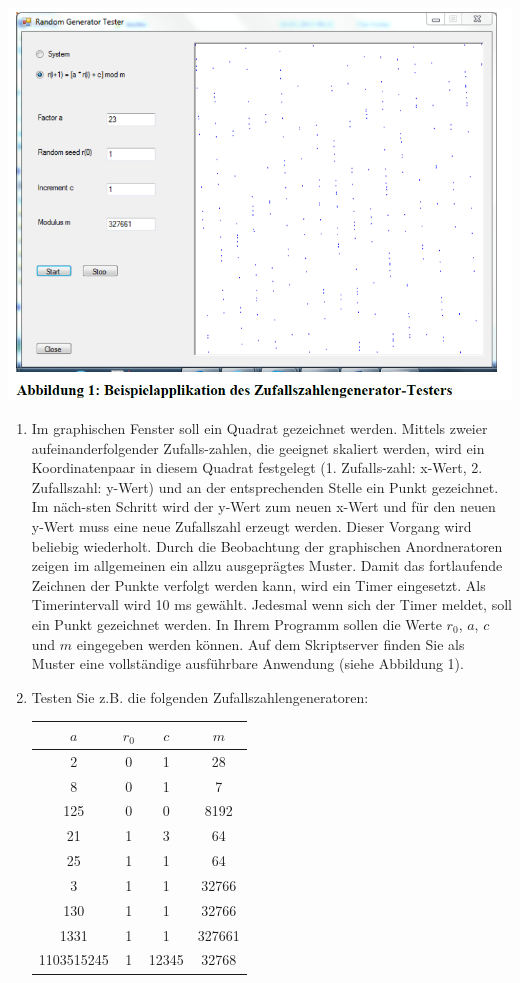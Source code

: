\includegraphics[width=.8\linewidth]{900-Praktika/prak04/pic2.PNG}
\begin{enumerate}
  \item Im graphischen Fenster soll ein Quadrat gezeichnet werden. Mittels zweier aufeinanderfolgender Zufalls-zahlen, die geeignet skaliert werden, wird ein Koordinatenpaar in diesem Quadrat festgelegt (1. Zufalls-zahl: x-Wert, 2. Zufallszahl: y-Wert) und an der entsprechenden Stelle ein Punkt gezeichnet. Im näch-sten Schritt wird der y-Wert zum neuen x-Wert und für den neuen y-Wert muss eine neue Zufallszahl erzeugt werden. Dieser Vorgang wird beliebig wiederholt. Durch die Beobachtung der graphischen Anordneratoren zeigen im allgemeinen ein allzu ausgeprägtes Muster. Damit das fortlaufende Zeichnen der Punkte verfolgt werden kann, wird ein Timer eingesetzt. Als Timerintervall wird 10 ms gewählt. Jedesmal wenn sich der Timer meldet, soll ein Punkt gezeichnet werden. In Ihrem Programm sollen die Werte $r_0$, $a$, $c$ und $m$ eingegeben werden können. Auf dem Skriptserver finden Sie als Muster eine vollständige ausführbare Anwendung (siehe Abbildung 1).
  \item Testen Sie z.B. die folgenden Zufallszahlengeneratoren:

  \begin{center}
           \begin{tabular}{c c c c}
           \hline
           \hline
           \textbf{$a$} &  \textbf{$r_0$} & \textbf{$c$} & \textbf{$m$} \\
           \hline

            2 & 0 & 1 & 28  \\
            8 & 0 & 1 & 7  \\
            125 & 0 & 0 & 8192  \\
            21 & 1 & 3 & 64  \\
            25 & 1 & 1 & 64  \\
            3 & 1 & 1 & 32766  \\
            130 & 1 & 1 & 32766  \\
            1331 & 1 & 1 & 327661  \\
            1103515245 & 1 & 12345 & 32768  \\


\end{tabular}
\end{center}
\end{enumerate}
